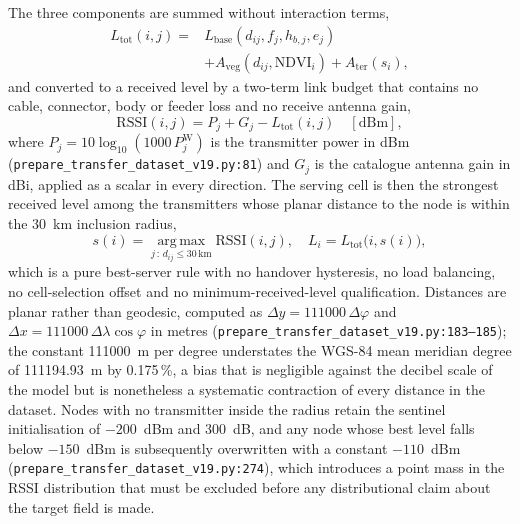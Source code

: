 The three components are summed without interaction terms,
\begin{equation}
\begin{split}
L_{\mathrm{tot}}(i,j) = {}& L_{\mathrm{base}}(d_{ij}, f_{j}, h_{b,j}, e_{j}) \\
 & + A_{\mathrm{veg}}(d_{ij}, \mathrm{NDVI}_{i})
   + A_{\mathrm{ter}}(s_{i}) ,
\end{split}
\label{eq:app-ltot}
\end{equation}
and converted to a received level by a two-term link budget that contains
no cable, connector, body or feeder loss and no receive antenna gain,
\begin{equation}
\mathrm{RSSI}(i,j) = P_{j} + G_{j} - L_{\mathrm{tot}}(i,j)
\quad [\mathrm{dBm}] ,
\label{eq:app-rssi}
\end{equation}
where $P_{j}=10\log_{10}(1000\,P_{j}^{\mathrm{W}})$ is the transmitter power
in dBm (\texttt{prepare\_\allowbreak{}transfer\_\allowbreak{}dataset\_\allowbreak{}v19.py:\allowbreak{}81}) and $G_{j}$ is the
catalogue antenna gain in dBi, applied as a scalar in every direction. The
serving cell is then the strongest received level among the transmitters
whose planar distance to the node is within the 30~km inclusion radius,
\begin{equation}
s(i) = \!\!\operatorname*{arg\,max}_{j \,:\, d_{ij} \le 30\,\mathrm{km}}\!\!
\mathrm{RSSI}(i,j),
\quad
L_{i} = L_{\mathrm{tot}}\bigl(i, s(i)\bigr) ,
\label{eq:app-serving}
\end{equation}
which is a pure best-server rule with no handover hysteresis, no load
balancing, no cell-selection offset and no minimum-received-level
qualification. Distances are planar rather than geodesic, computed as
$\Delta y = 111000\,\Delta\varphi$ and
$\Delta x = 111000\,\Delta\lambda\cos\varphi$ in metres
(\texttt{prepare\_\allowbreak{}transfer\_\allowbreak{}dataset\_\allowbreak{}v19.py:\allowbreak{}183--185}); the constant
111000~m per degree understates the WGS-84 mean meridian degree of
111194.93~m by 0.175\,\%, a bias that is negligible against the decibel
scale of the model but is nonetheless a systematic contraction of every
distance in the dataset. Nodes with no transmitter inside the radius retain
the sentinel initialisation of $-200$~dBm and 300~dB, and any node whose
best level falls below $-150$~dBm is subsequently overwritten with a
constant $-110$~dBm (\texttt{prepare\_\allowbreak{}transfer\_\allowbreak{}dataset\_\allowbreak{}v19.py:\allowbreak{}274}),
which introduces a point mass in the RSSI distribution that must be
excluded before any distributional claim about the target field is made.

